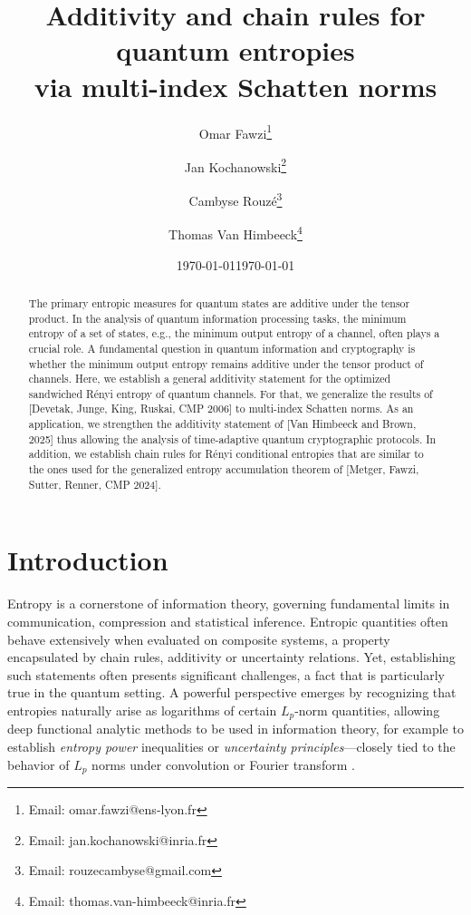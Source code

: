 \documentclass[11pt]{article}
\title{Additivity and chain rules for quantum entropies \\
 via multi-index Schatten norms}
\date{\today}
\author[1]{Omar Fawzi\thanks{Email: omar.fawzi@ens-lyon.fr}}
\author[2]{Jan Kochanowski\thanks{Email: jan.kochanowski@inria.fr}}
\author[2]{Cambyse Rouzé\thanks{Email: rouzecambyse@gmail.com}}
\author[3]{Thomas Van Himbeeck\thanks{Email: thomas.van-himbeeck@inria.fr}}
\affil[1]{Inria, ENS Lyon, UCBL, LIP, F-69342 Lyon Cedex 07, France}
\affil[2]{Inria, Télécom Paris - LTCI, Institut Polytechnique de Paris, 91120 Palaiseau, France}
\affil[3]{Inria Paris, France}
\date{\today}
\newcommand{\1}{\ensuremath{\mathbbm{1}}}
\theoremstyle{newdefinition}
\theoremstyle{newplain}
\theoremstyle{myplain}
\begin{document}
\maketitle

\begin{abstract}
The primary entropic measures for quantum states are additive under the tensor product. In the analysis of quantum information processing tasks, the minimum entropy of a set of states, e.g., the minimum output entropy of a channel, often plays a crucial role. A fundamental question in quantum information and cryptography is whether the minimum output entropy remains additive under the tensor product of channels. Here, we establish a general additivity statement for the optimized sandwiched R\'enyi entropy of quantum channels. For that, we generalize the results of [Devetak, Junge, King, Ruskai, CMP 2006] to multi-index Schatten norms. As an application, we strengthen the additivity statement of [Van Himbeeck and Brown, 2025] thus allowing the analysis of time-adaptive quantum cryptographic protocols. In addition, we establish chain rules for R\'enyi conditional entropies that are similar to the ones used for the generalized entropy accumulation theorem of [Metger, Fawzi, Sutter, Renner, CMP 2024].

\end{abstract}

\newpage 
\setcounter{tocdepth}{2}        %
\renewcommand{\contentsname}{Table of Contents}
\tableofcontents 

\newpage

\section{Introduction}

Entropy is a cornerstone of information theory, governing fundamental limits in communication, compression and statistical inference. 
Entropic quantities often behave extensively when evaluated on composite systems, a property encapsulated by chain rules, additivity or uncertainty relations. Yet, establishing such statements often presents significant challenges, a fact that is particularly true in the quantum setting. A powerful perspective emerges by recognizing that entropies naturally arise as logarithms of certain $L_p$-norm quantities, allowing deep functional analytic methods to be used in information theory, for example to establish \emph{entropy power} inequalities or \emph{uncertainty principles}—closely tied to the behavior of $L_p$ norms under convolution or Fourier transform
\cite{Lieb.1978,Dembo.1991}.
\end{document}
